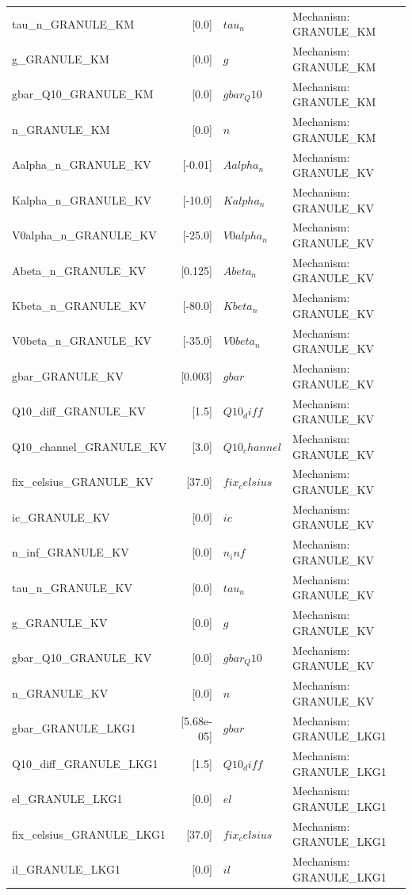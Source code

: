 \begin{tabular}{|l|r|l|l|}
tau_n_GRANULE_KM & [0.0] & $tau_n$ & Mechanism: GRANULE_KM \\
g_GRANULE_KM & [0.0] & $g$ & Mechanism: GRANULE_KM \\
gbar_Q10_GRANULE_KM & [0.0] & $gbar_Q10$ & Mechanism: GRANULE_KM \\
n_GRANULE_KM & [0.0] & $n$ & Mechanism: GRANULE_KM \\
Aalpha_n_GRANULE_KV & [-0.01] & $Aalpha_n$ & Mechanism: GRANULE_KV \\
Kalpha_n_GRANULE_KV & [-10.0] & $Kalpha_n$ & Mechanism: GRANULE_KV \\
V0alpha_n_GRANULE_KV & [-25.0] & $V0alpha_n$ & Mechanism: GRANULE_KV \\
Abeta_n_GRANULE_KV & [0.125] & $Abeta_n$ & Mechanism: GRANULE_KV \\
Kbeta_n_GRANULE_KV & [-80.0] & $Kbeta_n$ & Mechanism: GRANULE_KV \\
V0beta_n_GRANULE_KV & [-35.0] & $V0beta_n$ & Mechanism: GRANULE_KV \\
gbar_GRANULE_KV & [0.003] & $gbar$ & Mechanism: GRANULE_KV \\
Q10_diff_GRANULE_KV & [1.5] & $Q10_diff$ & Mechanism: GRANULE_KV \\
Q10_channel_GRANULE_KV & [3.0] & $Q10_channel$ & Mechanism: GRANULE_KV \\
fix_celsius_GRANULE_KV & [37.0] & $fix_celsius$ & Mechanism: GRANULE_KV \\
ic_GRANULE_KV & [0.0] & $ic$ & Mechanism: GRANULE_KV \\
n_inf_GRANULE_KV & [0.0] & $n_inf$ & Mechanism: GRANULE_KV \\
tau_n_GRANULE_KV & [0.0] & $tau_n$ & Mechanism: GRANULE_KV \\
g_GRANULE_KV & [0.0] & $g$ & Mechanism: GRANULE_KV \\
gbar_Q10_GRANULE_KV & [0.0] & $gbar_Q10$ & Mechanism: GRANULE_KV \\
n_GRANULE_KV & [0.0] & $n$ & Mechanism: GRANULE_KV \\
gbar_GRANULE_LKG1 & [5.68e-05] & $gbar$ & Mechanism: GRANULE_LKG1 \\
Q10_diff_GRANULE_LKG1 & [1.5] & $Q10_diff$ & Mechanism: GRANULE_LKG1 \\
el_GRANULE_LKG1 & [0.0] & $el$ & Mechanism: GRANULE_LKG1 \\
fix_celsius_GRANULE_LKG1 & [37.0] & $fix_celsius$ & Mechanism: GRANULE_LKG1 \\
il_GRANULE_LKG1 & [0.0] & $il$ & Mechanism: GRANULE_LKG1 \\

\end{tabular}
